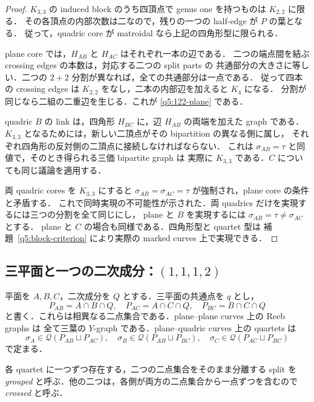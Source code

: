 \begin{proof}
$K_{3,3}$ の induced block のうち四頂点で genus one を持つものは $K_{2,2}$ に限る．
その各頂点の内部次数は二なので，残りの一つの half-edge が $P$ の葉となる．
従って，quadric core が matroidal なら上記の四角形型に限られる．

plane core では，$H_{AB}$ と $H_{AC}$ はそれぞれ一本の辺である．
二つの端点間を結ぶ crossing edges の本数は，対応する二つの split parts の
共通部分の大きさに等しい．二つの $2+2$ 分割が異なれば，全ての共通部分は一点である．
従って四本の crossing edges は $K_{2,2}$ をなし，二本の内部辺を加えると $K_4$ になる．
分割が同じなら二組の二重辺を生じる．これが \eqref{q5:122-plane} である．

quadric $B$ の link は，四角形 $H_{BC}$ に，辺 $H_{AB}$ の両端を加えた graph である．
$K_{3,3}$ となるためには，新しい二頂点がその bipartition の異なる側に属し，
それぞれ四角形の反対側の二頂点に接続しなければならない．
これは $\sigma_{AB}=\tau$ と同値で，そのとき得られる三価 bipartite graph は
実際に $K_{3,3}$ である．$C$ についても同じ議論を適用する．

両 quadric cores を $K_{3,3}$ にすると
$\sigma_{AB}=\sigma_{AC}=\tau$ が強制され，plane core の条件と矛盾する．
これで同時実現の不可能性が示された．両 quadrics だけを実現するには三つの分割を全て同じにし，
plane と $B$ を実現するには $\sigma_{AB}=\tau\ne\sigma_{AC}$ とする．
plane と $C$ の場合も同様である．四角形型と quartet 型は
補題~\ref{q5:block-criterion} により実際の marked curves 上で実現できる．
\end{proof}

\subsection{三平面と一つの二次成分：\texorpdfstring{$(1,1,1,2)$}{(1,1,1,2)}}

平面を $A,B,C$，二次成分を $Q$ とする．三平面の共通点を $q$ とし，
\[
 P_{AB}=A\cap B\cap Q,\quad
 P_{AC}=A\cap C\cap Q,\quad
 P_{BC}=B\cap C\cap Q
\]
と書く．これらは相異なる二点集合である．plane--plane curves 上の Reeb graphs は
全て三葉の $Y$-graph である．plane--quadric curves 上の quartets は
\[
 \sigma_A\in\mathcal Q(P_{AB}\sqcup P_{AC}),\quad
 \sigma_B\in\mathcal Q(P_{AB}\sqcup P_{BC}),\quad
 \sigma_C\in\mathcal Q(P_{AC}\sqcup P_{BC})
\]
で定まる．

各 quartet に一つずつ存在する，二つの二点集合をそのまま分離する split を
\emph{grouped} と呼ぶ．他の二つは，各側が両方の二点集合から一点ずつを含むので
\emph{crossed} と呼ぶ．


